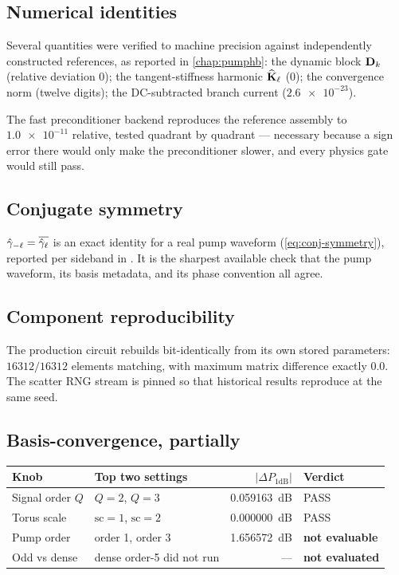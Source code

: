 \subsection{Numerical identities}

Several quantities were verified to machine precision against independently
constructed references, as reported in \cref{chap:pumphb}:
the dynamic block $\mathbf{D}_k$ (relative deviation $\num{0}$); the tangent-stiffness
harmonic $\widehat{\mathbf{K}}_\ell$ ($\num{0}$); the convergence norm (twelve digits); the
DC-subtracted branch current ($\num{2.6e-23}$).

The fast preconditioner backend reproduces the reference assembly to
$\num{1.0e-11}$ relative, tested quadrant by quadrant --- necessary because a
sign error there would only make the preconditioner slower, and every physics
gate would still pass.

\subsection{Conjugate symmetry}

$\hat{\gamma}_{-\ell} = \overline{\hat{\gamma}_\ell}$ is an exact identity for a real pump
waveform (\cref{eq:conj-symmetry}), reported per sideband in
. It is the sharpest available check that the
pump waveform, its basis metadata, and its phase convention all agree.

\subsection{Component reproducibility}

The production circuit rebuilds bit-identically from its own stored parameters:
$16312/16312$ elements matching, with maximum matrix difference exactly $0.0$.
The scatter RNG stream is pinned so that historical results reproduce at the
same seed.

\subsection{Basis-convergence, partially}

\begin{measured}
\begin{center}
\begin{tabular}{@{}l l r l@{}}
\toprule
Knob & Top two settings & $|\Delta P_{1\mathrm{dB}}|$ & Verdict \\
\midrule
Signal order $Q$ & $Q{=}2$, $Q{=}3$ & \SI{0.059163}{\dB} & PASS \\
Torus scale & $\text{sc}{=}1$, $\text{sc}{=}2$ & \SI{0.000000}{\dB} & PASS \\
Pump order & order 1, order 3 & \SI{1.656572}{\dB} & \textbf{not evaluable} \\
Odd vs dense & dense order-5 did not run & --- & \textbf{not evaluated} \\
\bottomrule
\end{tabular}
\end{center}
\end{measured}

